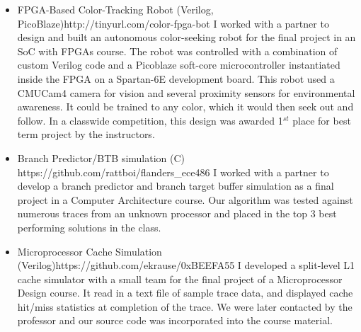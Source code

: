 \documentclass{article}
\begin{document}
	\vspace{-15pt}
	
	\begin{itemize}
		\item \NameUrlTextBlock
		{FPGA-Based Color-Tracking Robot (Verilog, PicoBlaze)}{http://tinyurl.com/color-fpga-bot}
		{I worked with a partner to design and built an autonomous color-seeking robot for the final project in an SoC with FPGAs course.  The robot was controlled with a combination of custom Verilog code and a Picoblaze soft-core microcontroller instantiated inside the FPGA on a Spartan-6E development board.  This robot used a CMUCam4 camera for vision and several proximity sensors for environmental awareness.  It could be trained to any color, which it would then seek out and follow. 
In a classwide competition, this design was awarded 1$^{st}$ place for best term project by the instructors.}
 
		\item \NameUrlTextBlock
		{Branch Predictor/BTB simulation (C)}	{https://github.com/rattboi/flanders_ece486}
		{I worked with a partner to develop a branch predictor and branch target buffer simulation as a final project in a Computer Architecture course.   Our algorithm was tested against numerous traces from an unknown processor and placed in the top 3 best performing solutions in the class.}
		
		\item \NameUrlTextBlock
		{Microprocessor Cache Simulation (Verilog)}{https://github.com/ekrause/0xBEEFA55}
		{I developed a split-level L1 cache simulator with a small team for the final project of a Microprocessor Design course. It read in a text file of sample trace data, and displayed cache hit/miss statistics at completion of the trace.  We were later contacted by the professor and our source code was incorporated into the course material.}
	\end{itemize}
	\vspace{-4pt}
\end{document}
